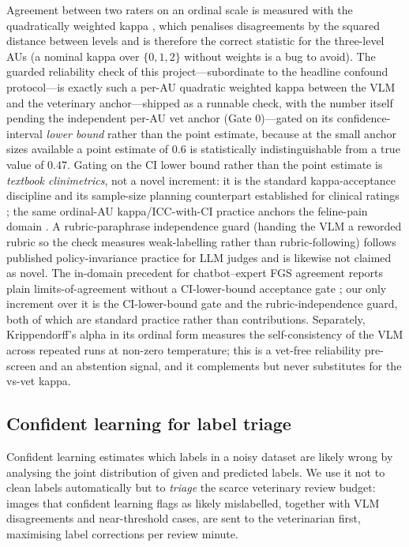 Agreement between two raters on an ordinal scale is measured with the
quadratically weighted kappa \cite{cohen1968kappa}, which penalises
disagreements by the squared distance between levels and is therefore the
correct statistic for the three-level AUs (a nominal kappa over
$\{0,1,2\}$ without weights is a bug to avoid). The guarded reliability check of
this project---subordinate to the headline confound protocol---is exactly such a
per-AU quadratic weighted kappa between the VLM and
the veterinary anchor---shipped as a runnable check, with the number itself
pending the independent per-AU vet anchor (Gate 0)---gated on its confidence-interval \emph{lower bound}
rather than the point estimate, because at the small anchor sizes available a
point estimate of $0.6$ is statistically indistinguishable from a true value of
$0.47$. Gating on the CI lower bound rather than the point estimate is
\emph{textbook clinimetrics}, not a novel increment: it is the standard
kappa-acceptance discipline and its sample-size planning counterpart established
for clinical ratings
\cite{tractenberg2010kappa,donner2010kappa,rotondi2012kappa,rotondi2018kappasize,simwright2005kappa};
the same ordinal-AU kappa/ICC-with-CI practice anchors the feline-pain domain
\cite{cheng2020fgs,evangelista2021fgs}. A rubric-paraphrase independence guard
(handing the VLM a reworded rubric so the check measures weak-labelling rather
than rubric-following) follows published policy-invariance practice for LLM
judges \cite{weng2026policy} and is likewise not claimed as novel. The
in-domain precedent for chatbot--expert FGS agreement reports plain
limits-of-agreement without a CI-lower-bound acceptance gate
\cite{chatbotfgs2025}; our only increment over it is the CI-lower-bound gate and
the rubric-independence guard, both of which are standard practice rather than
contributions. Separately, Krippendorff's alpha \cite{krippendorff2004} in its ordinal
form measures the self-consistency of the VLM across repeated runs at non-zero
temperature; this is a vet-free reliability pre-screen and an abstention signal,
and it complements but never substitutes for the vs-vet kappa.

\subsection{Confident learning for label triage}
\label{subsec:bg-confident}

Confident learning \cite{cleanlab2021} estimates which labels in a noisy dataset
are likely wrong by analysing the joint distribution of given and predicted
labels. We use it not to clean labels automatically but to \emph{triage} the
scarce veterinary review budget: images that confident learning flags as likely
mislabelled, together with VLM disagreements and near-threshold cases, are sent
to the veterinarian first, maximising label corrections per review minute.

